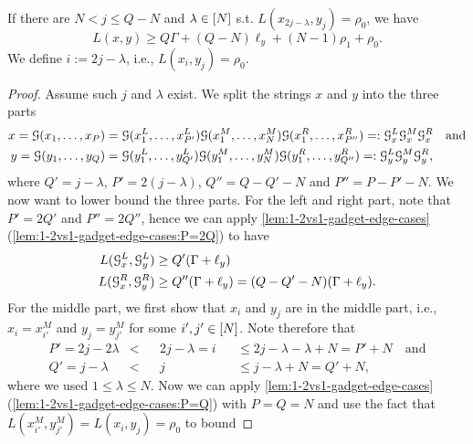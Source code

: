 \begin{lemma}
\label{lem:1-2vs1:ortho-lower-bound}
If there are $N < j \leq Q-N$ and $\lambda \in [N]$ s.t. $L(x_{2j-\lambda}, y_j) = \rho_0$, we have
\[ 
L(x,y) \geq Q\Gamma + (Q-N)\ell_y + (N-1)\rho_1 + \rho_0.
\]
We define $i := 2j - \lambda$, i.e., $L(x_i, y_j) = \rho_0$.
\end{lemma}

\begin{proof}
Assume such $j$ and $\lambda$ exist.
We split the strings $x$ and $y$ into the three parts
\begin{align*}
x = \mathcal{G}(x_1, \ldots, x_P) &= \mathcal{G}(x^L_1, \ldots, x^L_{P'}) \mathcal{G}(x^M_1, \ldots, x^M_N) \mathcal{G}(x^R_1, \ldots, x^R_{P''}) =: \mathcal{G}^L_x\mathcal{G}^M_x\mathcal{G}^R_x \quad\text{and}\\
y = \mathcal{G}(y_1, \ldots, y_Q) &= \mathcal{G}(y^L_1, \ldots, y^L_{Q'}) \mathcal{G}(y^M_1, \ldots, y^M_N) \mathcal{G}(y^R_1, \ldots, y^R_{Q''}) =: \mathcal{G}^L_y\mathcal{G}^M_y\mathcal{G}^R_y,
\end{align*}
where $Q' = j - \lambda$, $P' = 2(j - \lambda)$, $Q'' = Q - Q' - N$ and $P'' = P - P' - N$.
We now want to lower bound the three parts. %
For the left and right part, note that $P' = 2Q'$ and $P'' = 2Q''$, hence we can apply \autoref{lem:1-2vs1-gadget-edge-cases} (\ref{lem:1-2vs1-gadget-edge-cases:P=2Q}) to have
\begin{align*}
L(\mathcal{G}^L_x, \mathcal{G}^L_y) &\geq Q'(\Gamma + \ell_y) \\
L(\mathcal{G}^R_x, \mathcal{G}^R_y) &\geq Q''(\Gamma + \ell_y) = (Q - Q' - N)(\Gamma + \ell_y).
\end{align*}
For the middle part, we first show that $x_i$ and $y_j$ are in the middle part, i.e., $x_i = x^M_{i'}$ and $y_j = y^M_{j'}$ for some $i', j' \in [N]$.
Note therefore that
\begin{align*}
P' = 2j - 2\lambda &<& &2j - \lambda = i& &\leq 2j - \lambda - \lambda + N = P' + N \quad\text{and}\\
Q' = j - \lambda &<& &j& &\leq j - \lambda + N = Q' + N,
\end{align*}
where we used $1 \leq \lambda \leq N$.
Now we can apply \autoref{lem:1-2vs1-gadget-edge-cases} (\ref{lem:1-2vs1-gadget-edge-cases:P=Q}) with $P=Q=N$ and use the fact that $L(x^M_{i'}, y^M_{j'}) = L(x_i, y_j) = \rho_0$ to bound

\end{proof}

